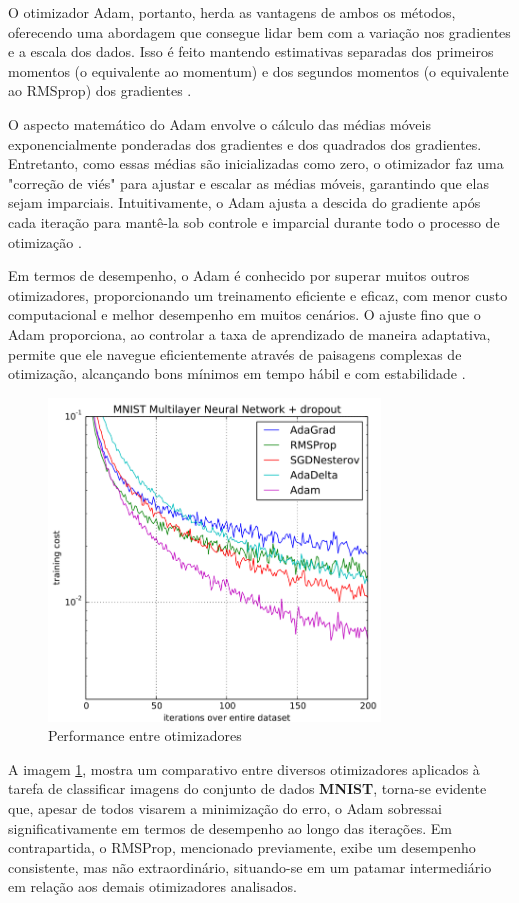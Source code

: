 O otimizador Adam, portanto, herda as vantagens de ambos os métodos, oferecendo uma abordagem que consegue lidar bem com a variação nos gradientes e a escala dos dados. Isso é feito mantendo estimativas separadas dos primeiros momentos (o equivalente ao momentum) e dos segundos momentos (o equivalente ao RMSprop) dos gradientes \cite{gess2023convergence}.

O aspecto matemático do Adam envolve o cálculo das médias móveis exponencialmente ponderadas dos gradientes e dos quadrados dos gradientes. Entretanto, como essas médias são inicializadas como zero, o otimizador faz uma "correção de viés" para ajustar e escalar as médias móveis, garantindo que elas sejam imparciais. Intuitivamente, o Adam ajusta a descida do gradiente após cada iteração para mantê-la sob controle e imparcial durante todo o processo de otimização \cite{Watt2016MachineLearning}.

Em termos de desempenho, o Adam é conhecido por superar muitos outros otimizadores, proporcionando um treinamento eficiente e eficaz, com menor custo computacional e melhor desempenho em muitos cenários. O ajuste fino que o Adam proporciona, ao controlar a taxa de aprendizado de maneira adaptativa, permite que ele navegue eficientemente através de paisagens complexas de otimização, alcançando bons mínimos em tempo hábil e com estabilidade \cite{gess2023convergence}.


\begin{figure}[!ht]
    \begin{center}
    \includegraphics[width=250pt]{pictures/performance.png}
    \caption{Performance entre otimizadores}
    \label{pic:performance}
    \end{center}
\end{figure}


A imagem \ref{pic:performance}, mostra um comparativo entre diversos otimizadores aplicados à tarefa de classificar imagens do conjunto de dados \textbf{MNIST}, torna-se evidente que, apesar de todos visarem a minimização do erro, o Adam sobressai significativamente em termos de desempenho ao longo das iterações. Em contrapartida, o RMSProp, mencionado previamente, exibe um desempenho consistente, mas não extraordinário, situando-se em um patamar intermediário em relação aos demais otimizadores analisados.



